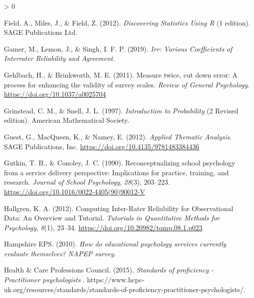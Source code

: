 \documentclass[
  english,
  man]{apa}
\newlength{\cslhangindent}
\newenvironment{CSLReferences}[2] %
 {%
  \setlength{\parindent}{0pt}
  \ifodd #1 \everypar{\setlength{\hangindent}{\cslhangindent}}\ignorespaces\fi
  \ifnum #2 > 0
  \setlength{\parskip}{#2\baselineskip}
  \fi
 }%
 {}
\begin{document}
\begin{CSLReferences}{1}{0}
\leavevmode\hypertarget{ref-fieldDiscoveringStatisticsUsing2012}{}%
Field, A., Miles, J., \& Field, Z. (2012). \emph{Discovering {Statistics Using R}} (1 edition). {SAGE Publications Ltd}.

\leavevmode\hypertarget{ref-gamerIrrVariousCoefficients2019}{}%
Gamer, M., Lemon, J., \& Singh, I. F. P. (2019). \emph{Irr: {Various Coefficients} of {Interrater Reliability} and {Agreement}}.

\leavevmode\hypertarget{ref-gehlbachMeasureTwiceCut2011}{}%
Gehlbach, H., \& Brinkworth, M. E. (2011). Measure twice, cut down error: {A} process for enhancing the validity of survey scales. \emph{Review of General Psychology}. \url{https://doi.org/10.1037/a0025704}

\leavevmode\hypertarget{ref-grinsteadIntroductionProbability1997}{}%
Grinstead, C. M., \& Snell, J. L. (1997). \emph{Introduction to {Probability}} (2 Revised edition). {American Mathematical Society}.

\leavevmode\hypertarget{ref-guestAppliedThematicAnalysis2012}{}%
Guest, G., MacQueen, K., \& Namey, E. (2012). \emph{Applied {Thematic Analysis}}. {SAGE Publications, Inc.} \url{https://doi.org/10.4135/9781483384436}

\leavevmode\hypertarget{ref-gutkinReconceptualizingSchoolPsychology1990}{}%
Gutkin, T. B., \& Conoley, J. C. (1990). Reconceptualizing school psychology from a service delivery perspective: {Implications} for practice, training, and research. \emph{Journal of School Psychology}, \emph{28}(3), 203--223. \url{https://doi.org/10.1016/0022-4405(90)90012-V}

\leavevmode\hypertarget{ref-hallgrenComputingInterRaterReliability2012}{}%
Hallgren, K. A. (2012). Computing {Inter}-{Rater Reliability} for {Observational Data}: {An Overview} and {Tutorial}. \emph{Tutorials in Quantitative Methods for Psychology}, \emph{8}(1), 23--34. \url{https://doi.org/10.20982/tqmp.08.1.p023}

\leavevmode\hypertarget{ref-hampshireepsHowEducationalPsychology2010}{}%
Hampshire EPS. (2010). \emph{How do educational psychology services currently evaluate themselves? {NAPEP} survey.}

\leavevmode\hypertarget{ref-healthcareprofessionscouncilStandardsProficiencyPractitioner2015a}{}%
Health \& Care Professions Council. (2015). \emph{Standards of proficiency - {Practitioner} psychologists \textbar{}}. https://www.hcpc-uk.org/resources/standards/standards-of-proficiency-practitioner-psychologists/.


\end{CSLReferences}
\end{document}
